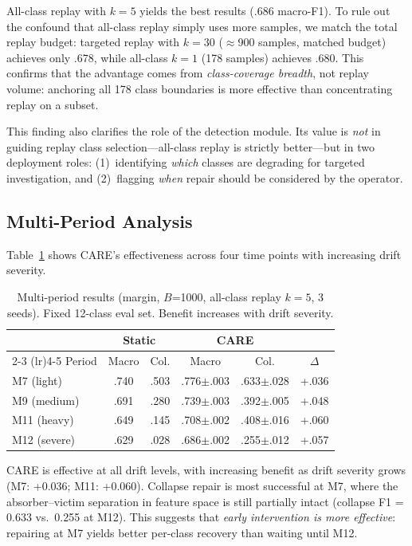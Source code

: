 \documentclass[journal]{IEEEtran}
\newcommand{\ours}{CARE}  %
\begin{document}
All-class replay with $k{=}5$ yields the best results (.686 macro-F1).
To rule out the confound that all-class replay simply uses more samples, we match the total replay budget: targeted replay with $k{=}30$ (${\approx}$900 samples, matched budget) achieves only .678, while all-class $k{=}1$ (178 samples) achieves .680.
This confirms that the advantage comes from \textit{class-coverage breadth}, not replay volume: anchoring all 178 class boundaries is more effective than concentrating replay on a subset.

This finding also clarifies the role of the detection module.
Its value is \textit{not} in guiding replay class selection---all-class replay is strictly better---but in two deployment roles: (1)~identifying \textit{which} classes are degrading for targeted investigation, and (2)~flagging \textit{when} repair should be considered by the operator.

\subsection{Multi-Period Analysis}
\label{sec:multi_period}

Table~\ref{tab:multiperiod} shows \ours{}'s effectiveness across four time points with increasing drift severity.

\begin{table}[t]
\centering
\caption{Multi-period results (margin, $B$=1000, all-class replay $k{=}5$, 3 seeds). Fixed 12-class eval set. Benefit increases with drift severity.}
\label{tab:multiperiod}
\scriptsize
\setlength{\tabcolsep}{3pt}
\begin{tabular}{@{}l cc cc c@{}}
\toprule
& \multicolumn{2}{c}{Static} & \multicolumn{2}{c}{\ours{}} & \\
\cmidrule(lr){2-3} \cmidrule(lr){4-5}
Period & Macro & Col. & Macro & Col. & $\Delta$ \\
\midrule
M7 (light)   & .740 & .503 & .776$\pm$.003 & .633$\pm$.028 & +.036 \\
M9 (medium)  & .691 & .280 & .739$\pm$.003 & .392$\pm$.005 & +.048 \\
M11 (heavy)  & .649 & .145 & .708$\pm$.002 & .408$\pm$.016 & +.060 \\
M12 (severe) & .629 & .028 & .686$\pm$.002 & .255$\pm$.012 & +.057 \\
\bottomrule
\end{tabular}
\end{table}

\ours{} is effective at all drift levels, with increasing benefit as drift severity grows (M7: +0.036; M11: +0.060).
Collapse repair is most successful at M7, where the absorber--victim separation in feature space is still partially intact (collapse F1 = 0.633 vs.\ 0.255 at M12).
This suggests that \textit{early intervention is more effective}: repairing at M7 yields better per-class recovery than waiting until M12.
\end{document}
